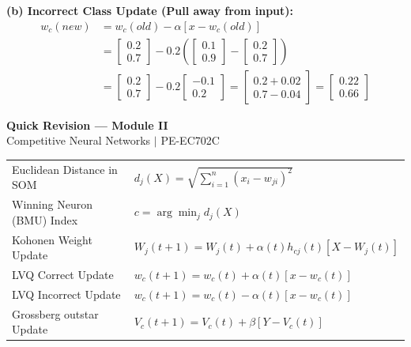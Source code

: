 \documentclass[12pt,a4paper]{article}
\renewcommand{\arraystretch}{1.45}
\begin{document}
\begin{tcolorbox}[examplebox, title={LVQ Classifier Updates}]
\textbf{(b) Incorrect Class Update (Pull away from input):}
\begin{align*}
  w_c(new) &= w_c(old) - \alpha [x - w_c(old)] \\
  &= \begin{bmatrix} 0.2 \\ 0.7 \end{bmatrix} - 0.2 \left( \begin{bmatrix} 0.1 \\ 0.9 \end{bmatrix} - \begin{bmatrix} 0.2 \\ 0.7 \end{bmatrix} \right) \\
  &= \begin{bmatrix} 0.2 \\ 0.7 \end{bmatrix} - 0.2 \begin{bmatrix} -0.1 \\ 0.2 \end{bmatrix} = \begin{bmatrix} 0.2 + 0.02 \\ 0.7 - 0.04 \end{bmatrix} = \begin{bmatrix} 0.22 \\ 0.66 \end{bmatrix}
\end{align*}
\end{tcolorbox}

\newpage

\begin{center}
  {\large\bfseries\color{myred} Quick Revision --- Module II}\\[3pt]
  {\small\color{mydark} Competitive Neural Networks $|$ PE-EC702C}
\end{center}
\noindent{\color{myred}\rule{\linewidth}{1.2pt}}
\vspace{4pt}

\begin{tcolorbox}[formulabox, title={\textbf{Key Formulas at a Glance}}]
\renewcommand{\arraystretch}{1.3}
\begin{tabularx}{\linewidth}{B{5.0cm} X}Euclidean Distance in SOM & $d_j(X) = \sqrt{\sum_{i=1}^n (x_i - w_{ji})^2}$ \\
Winning Neuron (BMU) Index & $c = \arg\min_j d_j(X)$ \\
Kohonen Weight Update & $W_j(t+1) = W_j(t) + \alpha(t) h_{cj}(t) [X - W_j(t)]$ \\
LVQ Correct Update & $w_c(t+1) = w_c(t) + \alpha(t) [x - w_c(t)]$ \\
LVQ Incorrect Update & $w_c(t+1) = w_c(t) - \alpha(t) [x - w_c(t)]$ \\
Grossberg outstar Update & $V_c(t+1) = V_c(t) + \beta [Y - V_c(t)]$
\end{tabularx}
\end{tcolorbox}
\end{document}
